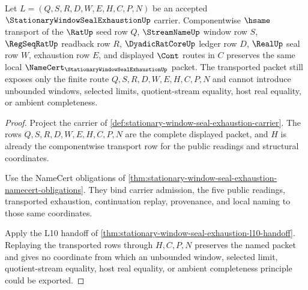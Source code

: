 \begin{theorem}
\label{thm:stationary-window-seal-exhaustion-transport-stability}
Let $L=(Q,S,R,D,W,E,H,C,P,N)$ be an accepted $\StationaryWindowSealExhaustionUp$ carrier. Componentwise $\hsame$ transport of the $\RatUp$ seed row $Q$, $\StreamNameUp$ window row $S$, $\RegSeqRatUp$ readback row $R$, $\DyadicRatCoreUp$ ledger row $D$, $\RealUp$ seal row $W$, exhaustion row $E$, and displayed $\Cont$ routes in $C$ preserves the same local $\NameCert_{\StationaryWindowSealExhaustionUp}$ packet. The transported packet still exposes only the finite route $Q,S,R,D,W,E,H,C,P,N$ and cannot introduce unbounded windows, selected limits, quotient-stream equality, host real equality, or ambient completeness.
\end{theorem}
\begin{proof}
Project the carrier of \autoref{def:stationary-window-seal-exhaustion-carrier}. The rows $Q,S,R,D,W,E,H,C,P,N$ are the complete displayed packet, and $H$ is already the componentwise transport row for the public readings and structural coordinates.

Use the NameCert obligations of \autoref{thm:stationary-window-seal-exhaustion-namecert-obligations}. They bind carrier admission, the five public readings, transported exhaustion, continuation replay, provenance, and local naming to those same coordinates.

Apply the L10 handoff of \autoref{thm:stationary-window-seal-exhaustion-l10-handoff}. Replaying the transported rows through $H,C,P,N$ preserves the named packet and gives no coordinate from which an unbounded window, selected limit, quotient-stream equality, host real equality, or ambient completeness principle could be exported.
\end{proof}

